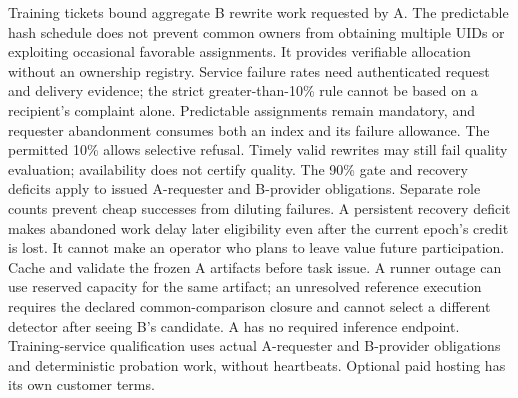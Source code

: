 Training tickets bound aggregate B rewrite work requested by A. The
predictable hash schedule does not prevent common owners from obtaining
multiple UIDs or exploiting occasional favorable assignments. It
provides verifiable allocation without an ownership registry. Service
failure rates need authenticated request and delivery evidence; the
strict greater-than-10\% rule cannot be based on a recipient's complaint
alone. Predictable assignments remain mandatory, and requester abandonment
consumes both an index and its failure allowance. The permitted 10\%
allows selective refusal. Timely valid rewrites may still fail quality
evaluation; availability does not certify quality. The 90\% gate and
recovery deficits apply to issued A-requester and B-provider obligations.
Separate role counts prevent cheap successes from diluting failures.
A persistent recovery deficit makes abandoned work delay later
eligibility even after the current epoch's credit is lost. It cannot
make an operator who plans to leave value future participation.
Cache and validate the frozen A artifacts before task issue. A runner
outage can use reserved capacity for the same artifact; an unresolved
reference execution requires the declared common-comparison closure and
cannot select a different detector after seeing B's candidate.
A has no required inference endpoint. Training-service qualification uses
actual A-requester and B-provider obligations and deterministic probation
work, without heartbeats. Optional paid hosting has its own customer terms.
